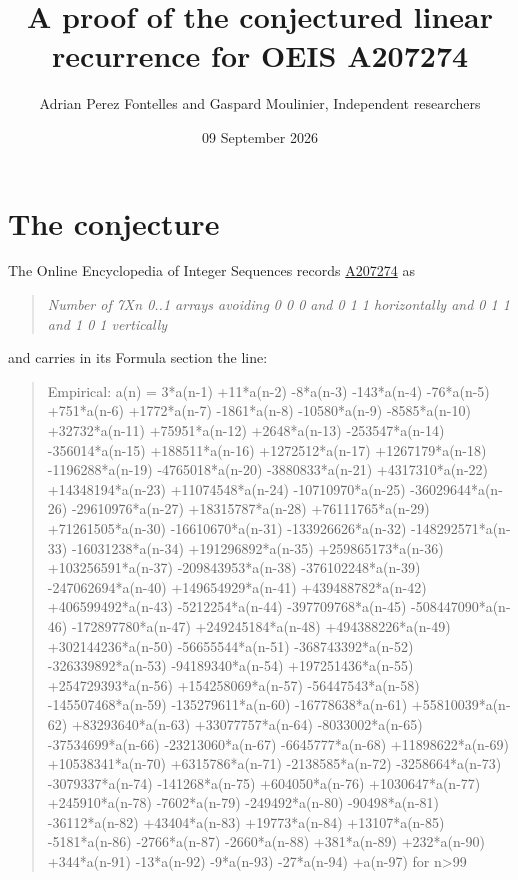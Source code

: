 \documentclass[11pt]{article}
\title{A proof of the conjectured linear recurrence for OEIS A207274}
\author{Adrian Perez Fontelles and Gaspard Moulinier, Independent researchers}
\date{09 September 2026}
\theoremstyle{definition}
\begin{document}
\maketitle
\section{The conjecture}

The Online Encyclopedia of Integer Sequences records \href{https://oeis.org/A207274}{A207274} as

\begin{quote}\itshape Number of 7Xn 0..1 arrays avoiding 0 0 0 and 0 1 1 horizontally and 0 1 1 and 1 0 1 vertically\end{quote}

and carries in its Formula section the line:

\begin{quote}\ttfamily Empirical: a(n) = 3*a(n-1) +11*a(n-2) -8*a(n-3) -143*a(n-4) -76*a(n-5) +751*a(n-6) +1772*a(n-7) -1861*a(n-8) -10580*a(n-9) -8585*a(n-10) +32732*a(n-11) +75951*a(n-12) +2648*a(n-13) -253547*a(n-14) -356014*a(n-15) +188511*a(n-16) +1272512*a(n-17) +1267179*a(n-18) -1196288*a(n-19) -4765018*a(n-20) -3880833*a(n-21) +4317310*a(n-22) +14348194*a(n-23) +11074548*a(n-24) -10710970*a(n-25) -36029644*a(n-26) -29610976*a(n-27) +18315787*a(n-28) +76111765*a(n-29) +71261505*a(n-30) -16610670*a(n-31) -133926626*a(n-32) -148292571*a(n-33) -16031238*a(n-34) +191296892*a(n-35) +259865173*a(n-36) +103256591*a(n-37) -209843953*a(n-38) -376102248*a(n-39) -247062694*a(n-40) +149654929*a(n-41) +439488782*a(n-42) +406599492*a(n-43) -5212254*a(n-44) -397709768*a(n-45) -508447090*a(n-46) -172897780*a(n-47) +249245184*a(n-48) +494388226*a(n-49) +302144236*a(n-50) -56655544*a(n-51) -368743392*a(n-52) -326339892*a(n-53) -94189340*a(n-54) +197251436*a(n-55) +254729393*a(n-56) +154258069*a(n-57) -56447543*a(n-58) -145507468*a(n-59) -135279611*a(n-60) -16778638*a(n-61) +55810039*a(n-62) +83293640*a(n-63) +33077757*a(n-64) -8033002*a(n-65) -37534699*a(n-66) -23213060*a(n-67) -6645777*a(n-68) +11898622*a(n-69) +10538341*a(n-70) +6315786*a(n-71) -2138585*a(n-72) -3258664*a(n-73) -3079337*a(n-74) -141268*a(n-75) +604050*a(n-76) +1030647*a(n-77) +245910*a(n-78) -7602*a(n-79) -249492*a(n-80) -90498*a(n-81) -36112*a(n-82) +43404*a(n-83) +19773*a(n-84) +13107*a(n-85) -5181*a(n-86) -2766*a(n-87) -2660*a(n-88) +381*a(n-89) +232*a(n-90) +344*a(n-91) -13*a(n-92) -9*a(n-93) -27*a(n-94) +a(n-97) for n>99\end{quote}
\end{document}
